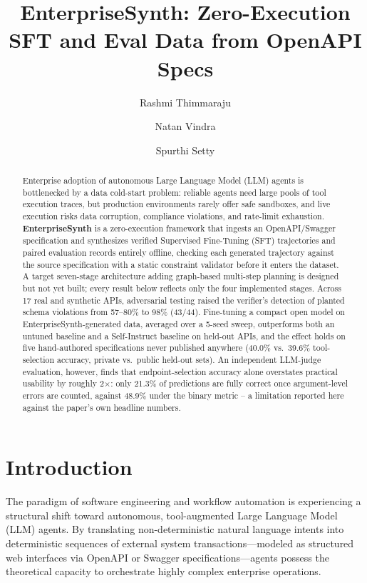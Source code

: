 \documentclass[11pt]{article}
\title{EnterpriseSynth: Zero-Execution SFT and Eval Data from OpenAPI Specs}
\author{Rashmi Thimmaraju \and Natan Vindra \and Spurthi Setty}
\date{}
\begin{document}
\maketitle

\begin{abstract}
Enterprise adoption of autonomous Large Language Model (LLM) agents is bottlenecked by a data
cold-start problem: reliable agents need large pools of tool execution traces, but production
environments rarely offer safe sandboxes, and live execution risks data corruption, compliance
violations, and rate-limit exhaustion. \textbf{EnterpriseSynth} is a zero-execution framework that
ingests an OpenAPI/Swagger specification and synthesizes verified Supervised Fine-Tuning (SFT)
trajectories and paired evaluation records entirely offline, checking each generated trajectory
against the source specification with a static constraint validator before it enters the dataset.
A target seven-stage architecture adding graph-based multi-step planning is designed but not yet
built; every result below reflects only the four implemented stages. Across 17 real and synthetic
APIs, adversarial testing raised the verifier's detection of planted schema violations from
57--80\% to 98\% (43/44). Fine-tuning a compact open model on EnterpriseSynth-generated data, averaged
over a 5-seed sweep, outperforms both an untuned baseline and a Self-Instruct baseline on held-out
APIs, and the effect holds on five hand-authored specifications never published anywhere (40.0\%
vs.\ 39.6\% tool-selection accuracy, private vs.\ public held-out sets). An independent LLM-judge
evaluation, however, finds that endpoint-selection accuracy alone overstates practical usability
by roughly 2$\times$: only 21.3\% of predictions are fully correct once argument-level errors are
counted, against 48.9\% under the binary metric -- a limitation reported here against the paper's
own headline numbers.
\end{abstract}

\section{Introduction}
The paradigm of software engineering and workflow automation is experiencing a structural shift
toward autonomous, tool-augmented Large Language Model (LLM) agents. By translating
non-deterministic natural language intents into deterministic sequences of external system
transactions---modeled as structured web interfaces via OpenAPI or Swagger specifications---agents
possess the theoretical capacity to orchestrate highly complex enterprise operations.
\end{document}
